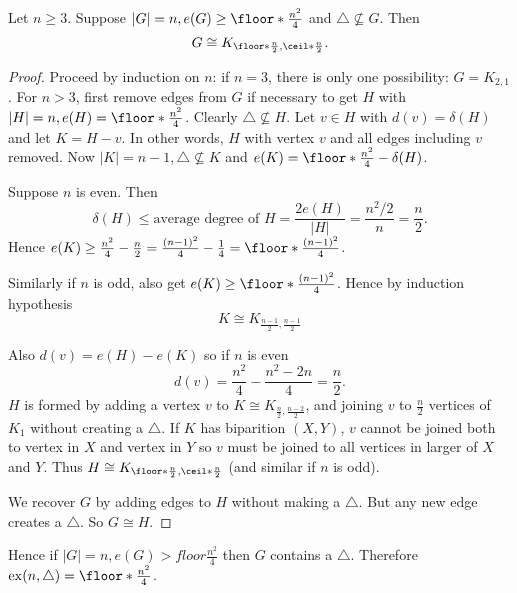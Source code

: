 \documentclass[a4paper]{article}
\DeclareMathOperator{\exx}{ex} %
\begin{document}
\begin{theorem}
  Let \(n\geq 3\). Suppose \(|G| = n, e(G) \geq \floor*{\frac{n^2}{4}}\) and \(\triangle \nsubseteq G\). Then
  \[
    G \cong K_{\floor*{\frac{n}{2}}, \ceil*{\frac{n}{2}}}.
  \]
\end{theorem}

\begin{proof}
  Proceed by induction on \(n\): if \(n=3\), there is only one possibility: \(G = K_{2,1}\). For \(n>3\), first remove edges from \(G\) if necessary to get \(H\) with \(|H| = n, e(H) = \floor*{\frac{n^2}{4}}\). Clearly \(\triangle \nsubseteq H\). Let \(v\in H\) with \(d(v) = \delta(H)\) and let \(K = H-v\). In other words, \(H\) with vertex \(v\) and all edges including \(v\) removed. Now \(|K| = n-1, \triangle \nsubseteq K\) and \(e(K) = \floor*{\frac{n^2}{4}} - \delta(H)\).

  Suppose \(n\) is even. Then
  \[
    \delta(H) \leq \text{average degree of } H = \frac{2e(H)}{|H|} = \frac{n^2/2}{n} = \frac{n}{2}.
  \]
  Hence \(e(K) \geq \frac{n^2}{4} - \frac{n}{2} = \frac{(n-1)^2}{4}-\frac{1}{4} = \floor*{\frac{(n-1)^2}{4}}\).

  Similarly if \(n\) is odd, also get \(e(K) \geq \floor*{\frac{(n-1)^2}{4}}\). Hence by induction hypothesis
  \[
    K \cong K_{\frac{n-1}{2},\frac{n-1}{2}}
  \]

  Also \(d(v) = e(H) - e(K)\) so if \(n\) is even
  \[
    d(v) = \frac{n^2}{4} - \frac{n^2-2n}{4} = \frac{n}{2}.
  \]
  \(H\) is formed by adding a vertex \(v\) to \(K \cong K_{\frac{n}{2},\frac{n-2}{2}}\), and joining \(v\) to \(\frac{n}{2}\) vertices of \(K_1\) without creating a \(\triangle\). If \(K\) has biparition \((X,Y)\), \(v\) cannot be joined both to vertex in \(X\) and vertex in \(Y\) so \(v\) must be joined to all vertices in larger of \(X\) and \(Y\). Thus \(H \cong K_{\floor*{\frac{n}{2}},\ceil*{\frac{n}{2}}}\) (and similar if \(n\) is odd).

  We recover \(G\) by adding edges to \(H\) without making a \(\triangle\). But any new edge creates a \(\triangle\). So \(G \cong H\).
\end{proof}

Hence if \(|G|=n, e(G) > floor \frac{n^2}{4}\) then \(G\) contains a \(\triangle\). Therefore \(\exx(n, \triangle) = \floor*{\frac{n^2}{4}}\).
\fi


\printindex
\end{document}
